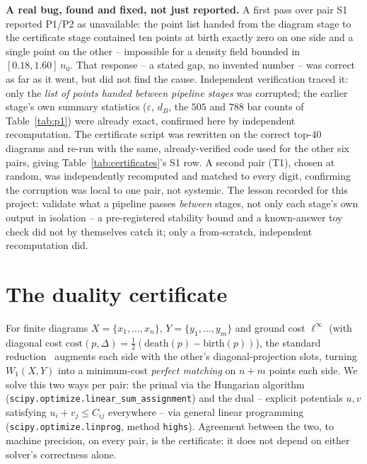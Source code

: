 \documentclass[11pt,a4paper]{article}
\newcommand{\dB}{d_{B}}
\begin{document}
\begin{fixbox}
\textbf{A real bug, found and fixed, not just reported.} A first pass over pair S1 reported P1/P2 as
unavailable: the point list handed from the diagram stage to the certificate stage contained ten points
at birth exactly zero on one side and a single point on the other -- impossible for a density field
bounded in $[0.18,1.60]\,n_0$. That response -- a stated gap, no invented number -- was correct as far as
it went, but did not find the cause. Independent verification traced it: only the \emph{list of points
handed between pipeline stages} was corrupted; the earlier stage's own summary statistics ($\varepsilon$,
$\dB$, the $505$ and $788$ bar counts of Table~\ref{tab:p1}) were already exact, confirmed here by
independent recomputation. The certificate script was rewritten on the correct top-$40$ diagrams and
re-run with the same, already-verified code used for the other six pairs, giving
Table~\ref{tab:certificates}'s S1 row. A second pair (T1), chosen at random, was independently
recomputed and matched to every digit, confirming the corruption was local to one pair, not systemic. The
lesson recorded for this project: validate what a pipeline passes \emph{between} stages, not only each
stage's own output in isolation -- a pre-registered stability bound and a known-answer toy check did not
by themselves catch it; only a from-scratch, independent recomputation did.
\end{fixbox}

\section{The duality certificate}
\label{sec:duality}

For finite diagrams $X=\{x_1,\ldots,x_n\}$, $Y=\{y_1,\ldots,y_m\}$ and ground cost $\ell^\infty$ (with
diagonal cost $\mathrm{cost}(p,\Delta)=\tfrac12(\mathrm{death}(p)-\mathrm{birth}(p))$), the standard
reduction~\cite{Kerber2017} augments each side with the other's diagonal-projection slots, turning
$W_1(X,Y)$ into a minimum-cost \emph{perfect matching} on $n{+}m$ points each side. We solve this two
ways per pair: the primal via the Hungarian algorithm
(\texttt{scipy.optimize.linear\_sum\_assignment}) and the dual -- explicit potentials $u,v$ satisfying
$u_i+v_j\le C_{ij}$ everywhere -- via general linear programming (\texttt{scipy.optimize.linprog},
method \texttt{highs}). Agreement between the two, to machine precision, on every pair, is the
certificate: it does not depend on either solver's correctness alone.
\end{document}
